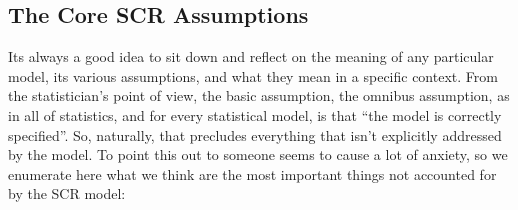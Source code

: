 \subsection{The Core SCR Assumptions}

Its always a good idea to sit down and reflect on the meaning of any
particular model, its various assumptions, and what they mean in a
specific context.  From the statistician's point of view, the basic
assumption, the omnibus assumption, as in all of statistics, and for
every statistical model, is that ``the model is correctly
specified''. So, naturally, that precludes everything that isn't
explicitly addressed by the model.
 To point this out to someone seems to cause a lot of
anxiety, so we enumerate here what we think are the most important things
not accounted for by the SCR model:

